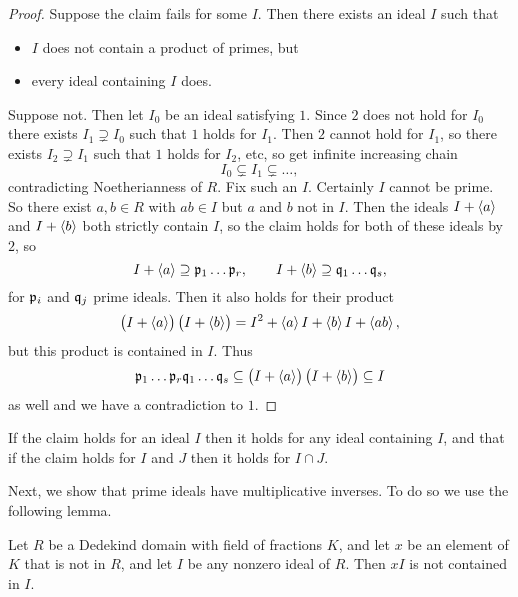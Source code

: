 \begin{proof}
Suppose the claim fails for some $ I $. Then there exists an ideal $ I $ such that
\begin{itemize}
\item $ I $ does not contain a product of primes, but
\item every ideal containing $ I $ does.
\end{itemize}
Suppose not. Then let $ I_0 $ be an ideal satisfying $ 1 $. Since $ 2 $ does not hold for $ I_0 $ there exists $ I_1 \supsetneq I_0 $ such that $ 1 $ holds for $ I_1 $. Then $ 2 $ cannot hold for $ I_1 $, so there exists $ I_2 \supsetneq I_1 $ such that $ 1 $ holds for $ I_2 $, etc, so get infinite increasing chain
$$ I_0 \subsetneq I_1 \subsetneq \dots, $$
contradicting Noetherianness of $ R $. Fix such an $ I $. Certainly $ I $ cannot be prime. So there exist $ a, b \in R $ with $ ab \in I $ but $ a $ and $ b $ not in $ I $. Then the ideals $ I + \left\langle a \right\rangle $ and $ I + \left\langle b \right\rangle $ both strictly contain $ I $, so the claim holds for both of these ideals by $ 2 $, so
$$ I + \left\langle a \right\rangle \supseteq \mathfrak{p}_1 \dots \mathfrak{p}_r, \qquad I + \left\langle b \right\rangle \supseteq \mathfrak{q}_1 \dots \mathfrak{q}_s, $$
for $ \mathfrak{p}_i $ and $ \mathfrak{q}_j $ prime ideals. Then it also holds for their product
$$ \br{I + \abr{a}}\br{I + \abr{b}} = I^2 + \abr{a}I + \abr{b}I + \abr{ab}, $$
but this product is contained in $ I $. Thus
$$ \pp_1 \dots \pp_r\qq_1 \dots \qq_s \subseteq \br{I + \abr{a}}\br{I + \abr{b}} \subseteq I $$
as well and we have a contradiction to $ 1 $.
\end{proof}

\begin{note*}
If the claim holds for an ideal $ I $ then it holds for any ideal containing $ I $, and that if the claim holds for $ I $ and $ J $ then it holds for $ I \cap J $.
\end{note*}

Next, we show that prime ideals have multiplicative inverses. To do so we use the following lemma.

\begin{lemma}
\label{lem:11.1.7}
Let $ R $ be a Dedekind domain with field of fractions $ K $, and let $ x $ be an element of $ K $ that is not in $ R $, and let $ I $ be any nonzero ideal of $ R $. Then $ xI $ is not contained in $ I $.
\end{lemma}

